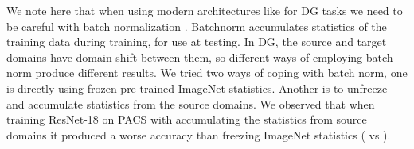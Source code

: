 \documentclass[10pt,twocolumn,letterpaper]{article}
\begin{document}
We note here that when using modern architectures like \cite{Szegedy2016inceptionv3, He2016resnet} for DG tasks we need to be careful with batch normalization \cite{Ioffe2015bn}. Batchnorm accumulates statistics of the training data during training, for use at testing. In DG, the source and target domains have domain-shift between them, so different ways of employing batch norm produce different results. We tried two ways of coping with batch norm, one is directly using frozen pre-trained ImageNet statistics. Another  is to unfreeze and accumulate statistics from the source domains. We observed that when training  ResNet-18 on PACS with accumulating the statistics from source domains it produced a worse accuracy than freezing ImageNet statistics ( vs ).





























\begin{table}[t]
\centering
{}
\vspace{-0.3cm}
\caption{\small Cross-domain object recognition results (accuracy. \%) of different methods on PACS using ResNet-18. Best in bold.}
\label{tab:agg-resnet-pacs}
      \vspace{-0.3cm}
\end{table}
\end{document}
